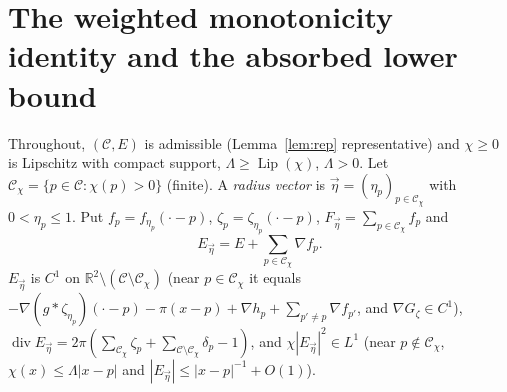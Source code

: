 \documentclass[11pt,reqno]{amsart}
\numberwithin{equation}{section}
\theoremstyle{plain}
\theoremstyle{definition}
\newcommand{\R}{\mathbb{R}}
\newcommand{\dvg}{\operatorname{div}}
\newcommand{\Lip}{\operatorname{Lip}}
\begin{document}
\section{The weighted monotonicity identity and the absorbed lower bound}\label{sec:monotone}

Throughout, $(\mathcal C,E)$ is admissible (Lemma~\ref{lem:rep} representative) and $\chi\ge0$ is Lipschitz with compact support, $\Lambda\ge\Lip(\chi)$, $\Lambda>0$.  Let $\mathcal C_\chi=\{p\in\mathcal C:\chi(p)>0\}$ (finite).  A \emph{radius vector} is $\vec\eta=(\eta_p)_{p\in\mathcal C_\chi}$ with $0<\eta_p\le1$.  Put $f_p=f_{\eta_p}(\cdot-p)$, $\zeta_p=\zeta_{\eta_p}(\cdot-p)$, $F_{\vec\eta}=\sum_{p\in\mathcal C_\chi}f_p$ and
\[
E_{\vec\eta}=E+\sum_{p\in\mathcal C_\chi}\nabla f_p .
\]
$E_{\vec\eta}$ is $C^1$ on $\R^2\setminus(\mathcal C\setminus\mathcal C_\chi)$ (near $p\in\mathcal C_\chi$ it equals $-\nabla(g*\zeta_{\eta_p})(\cdot-p)-\pi(x-p)+\nabla h_p+\sum_{p'\ne p}\nabla f_{p'}$, and $\nabla G_\zeta\in C^1$), $\dvg E_{\vec\eta}=2\pi(\sum_{\mathcal C_\chi}\zeta_p+\sum_{\mathcal C\setminus\mathcal C_\chi}\delta_p-1)$, and $\chi|E_{\vec\eta}|^2\in L^1$ (near $p\notin\mathcal C_\chi$, $\chi(x)\le\Lambda|x-p|$ and $|E_{\vec\eta}|\le|x-p|^{-1}+O(1)$).
\end{document}
